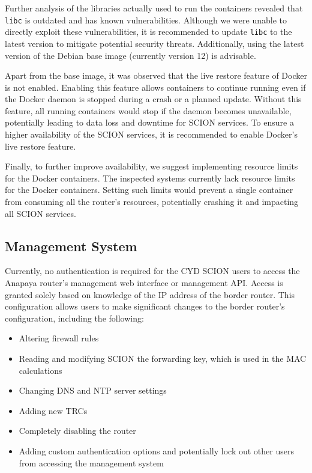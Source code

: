 Further analysis of the libraries actually used to run the containers revealed that \texttt{libc} is outdated and has known vulnerabilities.
Although we were unable to directly exploit these vulnerabilities, it is recommended to update \texttt{libc} to the latest version to mitigate potential security threats.
Additionally, using the latest version of the Debian base image (currently version 12) is advisable.

Apart from the base image, it was observed that the live restore feature of Docker is not enabled.
Enabling this feature allows containers to continue running even if the Docker daemon is stopped during a crash or a planned update.
Without this feature, all running containers would stop if the daemon becomes unavailable, potentially leading to data loss and downtime for SCION services.
To ensure a higher availability of the SCION services, it is recommended to enable Docker's live restore feature.

Finally, to further improve availability, we suggest implementing resource limits for the Docker containers.
The inspected systems currently lack resource limits for the Docker containers.
Setting such limits would prevent a single container from consuming all the router's resources, potentially crashing it and impacting all SCION services.



\subsection{Management System}
Currently, no authentication is required for the CYD SCION users to access the Anapaya router's management web interface or management API.
Access is granted solely based on knowledge of the IP address of the border router.
This configuration allows users to make significant changes to the border router's configuration, including the following:

\begin{itemize}
    \item Altering firewall rules
    \item Reading and modifying SCION the forwarding key, which is used in the MAC calculations
    \item Changing DNS and NTP server settings
    \item Adding new TRCs
    \item Completely disabling the router
    \item Adding custom authentication options and potentially lock out other users from accessing the management system
\end{itemize}

